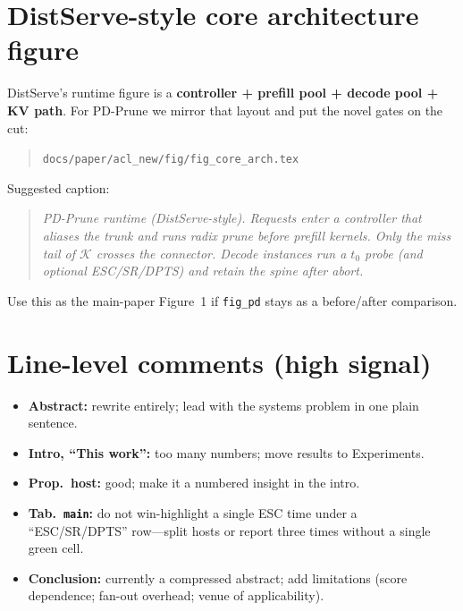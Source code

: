 \documentclass[11pt]{article}
\newcommand{\sys}{\textsf{PD-Prune}\xspace}
\newcommand{\Keep}{\mathcal{K}}
\begin{document}
\section{DistServe-style core architecture figure}
DistServe's runtime figure is a \textbf{controller + prefill pool + decode
pool + KV path}. For \sys we mirror that layout and put the novel gates on the
cut:

\begin{quote}
\texttt{docs/paper/acl\_new/fig/fig\_core\_arch.tex}
\end{quote}

Suggested caption:
\begin{quote}
\textit{\sys{} runtime (DistServe-style).
Requests enter a controller that aliases the trunk and runs radix prune
before prefill kernels. Only the miss tail of $\Keep$ crosses the connector.
Decode instances run a $t_0$ probe (and optional ESC/SR/DPTS) and retain the
spine after abort.}
\end{quote}
Use this as the main-paper Figure~1 if \texttt{fig\_pd} stays as a
before/after comparison.

\section{Line-level comments (high signal)}
\begin{itemize}
  \item \textbf{Abstract:} rewrite entirely; lead with the systems problem in
        one plain sentence.
  \item \textbf{Intro, ``This work'':} too many numbers; move results to
        Experiments.
  \item \textbf{Prop.~host:} good; make it a numbered insight in the intro.
  \item \textbf{Tab.~\texttt{main}:} do not win-highlight a single ESC time
        under a ``ESC/SR/DPTS'' row---split hosts or report three times without
        a single green cell.
  \item \textbf{Conclusion:} currently a compressed abstract; add limitations
        (score dependence; fan-out overhead; venue of applicability).
\end{itemize}
\end{document}
